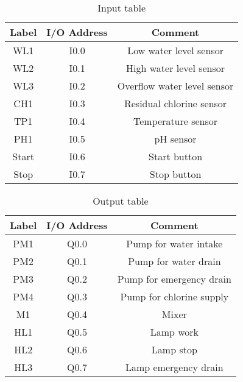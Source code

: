 \begin{table}[]
    \centering
    \begin{tabular}{|c|c|c|}
    \hline
       Label & I/O Address & Comment \\
       \hline
       WL1 & I0.0 & Low water level sensor\\
       \hline
       WL2 & I0.1 & High water level sensor\\
       \hline
       WL3 & I0.2 & Overflow water level sensor\\
       \hline
       CH1 & I0.3 & Residual chlorine sensor\\
       \hline
       TP1 & I0.4 & Temperature sensor\\
       \hline
       PH1 & I0.5 & pH sensor\\
       \hline
       Start & I0.6 & Start button\\
       \hline
       Stop & I0.7 & Stop button\\
       \hline
    \end{tabular}
    \caption{Input table}
    \label{tab:my_label}
\end{table}

\begin{table}[]
    \centering
    \begin{tabular}{|c|c|c|}
    \hline
       Label & I/O Address & Comment \\
       \hline
       PM1 & Q0.0 & Pump for water intake\\
       \hline
       PM2 & Q0.1 & Pump for water drain\\
       \hline
       PM3 & Q0.2 & Pump for emergency drain\\
       \hline
       PM4 & Q0.3 & Pump for chlorine supply\\
       \hline
       M1 & Q0.4 & Mixer\\
       \hline
       HL1 & Q0.5 & Lamp work\\
       \hline
       HL2 & Q0.6 & Lamp stop\\
       \hline
       HL3 & Q0.7 & Lamp emergency drain\\
       \hline
    \end{tabular}
    \caption{Output table}
    \label{tab:my_label}
\end{table}

